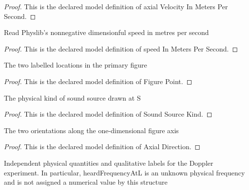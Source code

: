 \begin{proof}
  This is the declared model definition of axial Velocity In Meters Per Second.
\end{proof}
\begin{definition}
  \label{def:physics:phyx-mini-0194:phyxminiproblems-problemphyxmini0194-speedinmeterspersecond}
  Read Physlib's nonnegative dimensionful speed in metres per second
\end{definition}
\begin{proof}
  This is the declared model definition of speed In Meters Per Second.
\end{proof}
\begin{definition}
  \label{def:physics:phyx-mini-0194:phyxminiproblems-problemphyxmini0194-figurepoint}
  The two labelled locations in the primary figure
\end{definition}
\begin{proof}
  This is the declared model definition of Figure Point.
\end{proof}
\begin{definition}
  \label{def:physics:phyx-mini-0194:phyxminiproblems-problemphyxmini0194-soundsourcekind}
  The physical kind of sound source drawn at S
\end{definition}
\begin{proof}
  This is the declared model definition of Sound Source Kind.
\end{proof}
\begin{definition}
  \label{def:physics:phyx-mini-0194:phyxminiproblems-problemphyxmini0194-axialdirection}
  The two orientations along the one-dimensional figure axis
\end{definition}
\begin{proof}
  This is the declared model definition of Axial Direction.
\end{proof}
\begin{definition}
  \label{def:physics:phyx-mini-0194:phyxminiproblems-problemphyxmini0194-recedingsirensetup}
  Independent physical quantities and qualitative labels for the Doppler experiment. In particular, heardFrequencyAtL is an unknown physical frequency and is not assigned a numerical value by this structure
\end{definition}

